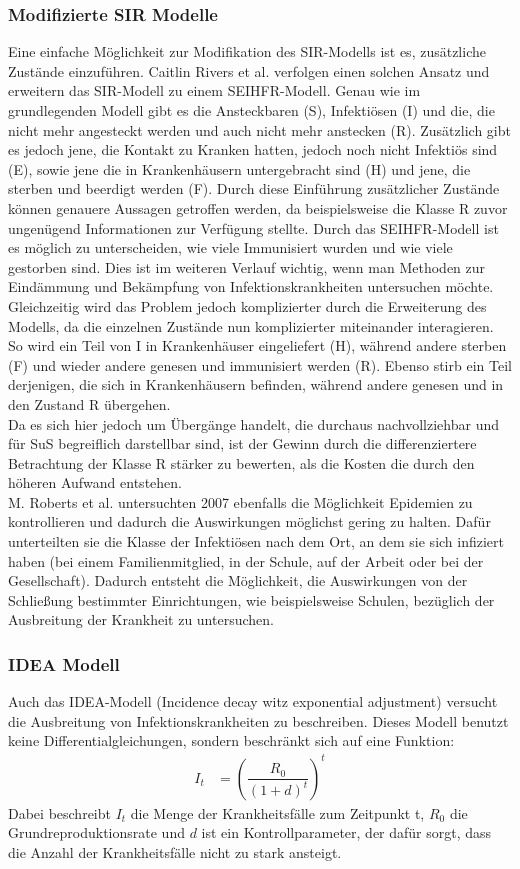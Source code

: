 \subsubsection{Modifizierte SIR Modelle}
\ellen
Eine einfache Möglichkeit zur Modifikation des SIR-Modells ist es, zusätzliche Zustände einzuführen. Caitlin Rivers et al. verfolgen einen solchen Ansatz und erweitern das SIR-Modell zu einem SEIHFR-Modell. 
Genau wie im grundlegenden Modell gibt es die Ansteckbaren (S), Infektiösen (I) und die, die nicht mehr angesteckt werden und auch nicht mehr anstecken (R). Zusätzlich gibt es jedoch jene, die Kontakt zu Kranken hatten, jedoch noch nicht Infektiös sind (E), sowie jene die in Krankenhäusern untergebracht sind (H) und jene, die sterben und beerdigt werden (F).
Durch diese Einführung zusätzlicher Zustände können genauere Aussagen getroffen werden, da beispielsweise die Klasse R zuvor ungenügend Informationen zur Verfügung stellte. Durch das SEIHFR-Modell ist es möglich zu unterscheiden, wie viele Immunisiert wurden und wie viele gestorben sind. Dies ist im weiteren Verlauf wichtig, wenn man Methoden zur Eindämmung und Bekämpfung von Infektionskrankheiten untersuchen möchte. Gleichzeitig wird das Problem jedoch komplizierter durch die Erweiterung des Modells, da die einzelnen Zustände nun komplizierter miteinander interagieren.\\
So wird ein Teil von I in Krankenhäuser eingeliefert (H), während andere sterben (F) und wieder andere genesen und immunisiert werden (R). Ebenso stirb ein Teil derjenigen, die sich in Krankenhäusern befinden, während andere genesen und in den Zustand R übergehen.\\
Da es sich hier jedoch um Übergänge handelt, die durchaus nachvollziehbar und für SuS begreiflich darstellbar sind, ist der Gewinn durch die differenziertere Betrachtung der Klasse R stärker zu bewerten, als die Kosten die durch den höheren Aufwand entstehen.\\
M. Roberts et al. untersuchten 2007 ebenfalls die Möglichkeit Epidemien zu kontrollieren und dadurch die Auswirkungen möglichst gering zu halten. Dafür unterteilten sie die Klasse der Infektiösen nach dem Ort, an dem sie sich infiziert haben (bei einem Familienmitglied, in der Schule, auf der Arbeit oder bei der Gesellschaft). Dadurch entsteht die Möglichkeit, die Auswirkungen von der Schließung bestimmter Einrichtungen, wie beispielsweise Schulen, bezüglich der Ausbreitung der Krankheit zu untersuchen.\\
\subsubsection{IDEA Modell}
\ellen
Auch das IDEA-Modell (Incidence decay witz exponential adjustment) versucht die Ausbreitung von Infektionskrankheiten zu beschreiben. Dieses Modell benutzt keine Differentialgleichungen, sondern beschränkt sich auf eine Funktion:\\
\begin{align}
I_t &=\left(\dfrac{R_0}{(1+d)^t}\right)^t
\end{align}
Dabei beschreibt $I_t$ die Menge der Krankheitsfälle zum Zeitpunkt t, $R_0$ die Grundreproduktionsrate und $d$ ist ein Kontrollparameter, der dafür sorgt, dass die Anzahl der Krankheitsfälle nicht zu stark ansteigt. 
